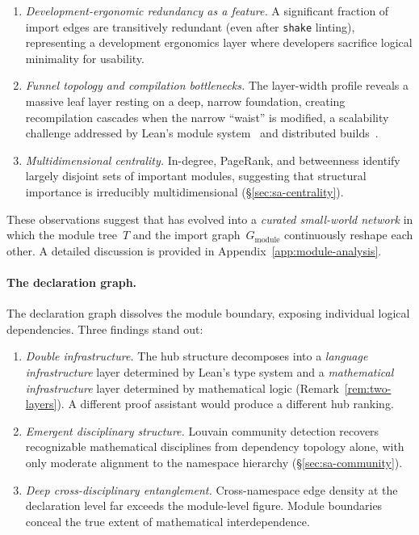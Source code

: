 \begin{enumerate}
    \item \textit{Development-ergonomic redundancy as a feature.} A significant fraction of import edges are transitively redundant (even after \texttt{shake} linting), representing a development ergonomics layer where developers sacrifice logical minimality for usability.

    \item \textit{Funnel topology and compilation bottlenecks.} The layer-width profile reveals a massive leaf layer resting on a deep, narrow foundation, creating recompilation cascades when the narrow ``waist'' is modified, a scalability challenge addressed by Lean's module system~\cite{baanen2025} and distributed builds~\cite{huch2024}.

    \item \textit{Multidimensional centrality.} In-degree, PageRank, and betweenness identify largely disjoint sets of important modules, suggesting that structural importance is irreducibly multidimensional (\S\ref{sec:sa-centrality}).
\end{enumerate}

\noindent
These observations suggest that  has evolved into a \textit{curated small-world network} in which the module tree~$T$ and the import graph~$G_{\mathrm{module}}$ continuously reshape each other. A detailed discussion is provided in Appendix~\ref{app:module-analysis}.

\paragraph{The declaration graph.}
\label{sec:thm-conclusion}
The declaration graph dissolves the module boundary, exposing individual logical dependencies. Three findings stand out:

\begin{enumerate}
    \item \textit{Double infrastructure.} The hub structure decomposes into a \emph{language infrastructure} layer determined by Lean's type system and a \emph{mathematical infrastructure} layer determined by mathematical logic (Remark~\ref{rem:two-layers}). A different proof assistant would produce a different hub ranking.

    \item \textit{Emergent disciplinary structure.} Louvain community detection recovers recognizable mathematical disciplines from dependency topology alone, with only moderate alignment to the namespace hierarchy (\S\ref{sec:sa-community}).

    \item \textit{Deep cross-disciplinary entanglement.} Cross-namespace edge density at the declaration level far exceeds the module-level figure. Module boundaries conceal the true extent of mathematical interdependence.
\end{enumerate}

